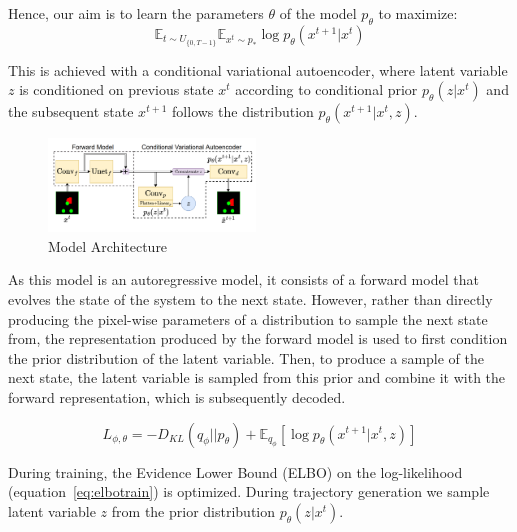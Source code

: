 \documentclass[a4paper,10pt,twocolumn]{article}
\begin{document}
            Hence, our aim is to learn the parameters $\theta$ of the model $p_\theta$ to maximize:
            \begin{equation}
                \mathbb{E}_{t \sim U_{\{0,T-1\}}} \mathbb{E}_{x^t \sim p_*} \log p_\theta(x^{t+1} | x^t)
            \end{equation}

            This is achieved with a conditional variational autoencoder, where latent variable 
            $z$ is conditioned on previous state $x^t$ according to conditional prior
            $p_\theta(z|x^t)$ and the subsequent state $x^{t+1}$ follows the 
            distribution $p_\theta(x^{t+1} | x^t, z)$.

            \begin{figure}[H]
                \centering
                \includegraphics[width=0.49\textwidth]{../images/architecture.png}
                \caption{Model Architecture}\label{fig:architecture}
            \end{figure}

            As this model is an autoregressive model, it consists of a forward model that evolves the state of
            the system to the next state. However, rather than directly producing the pixel-wise parameters of a
            distribution to sample the next state from, the representation produced by the forward model is used
            to first condition the prior distribution of the latent variable. Then, to produce a sample of the next
            state, the latent variable is sampled from this prior and combine it with the forward representation,
            which is subsequently decoded.

            \begin{equation}
                L_{\phi, \theta} = -D_{KL}(q_\phi || p_\theta)
                + \mathbb{E}_{q_\phi}[\log p_\theta(x^{t+1}|x^t, z)]
                \label{eq:elbotrain}
            \end{equation}
            
            During training, the Evidence Lower Bound (ELBO) on the log-likelihood (equation~\ref{eq:elbotrain})
            is optimized. During trajectory generation we sample latent variable $z$ from the prior 
            distribution $p_\theta(z | x^t)$.
            
\end{document}
